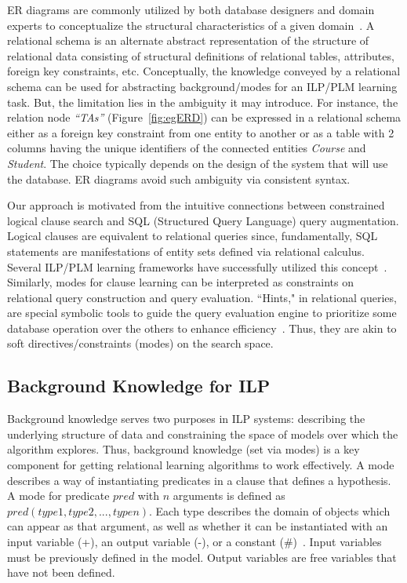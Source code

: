 \documentclass[sigconf]{acmart}
\begin{document}
ER diagrams are commonly utilized by both database designers and domain experts to conceptualize the structural characteristics of a given domain~\cite{garcia2009database}. A relational schema is an alternate abstract representation of the structure of relational data consisting of structural definitions of relational tables, attributes, foreign key constraints, etc. Conceptually, the knowledge conveyed by a relational schema can be used for abstracting background/modes for an ILP/PLM learning task. But, the limitation lies in the ambiguity it may introduce. For instance, the relation node \textit{``TAs''} (Figure~\ref{fig:egERD}) can be expressed in a relational schema either as a foreign key constraint from one entity to another or as a table with 2 columns having the unique identifiers of the connected entities \textit{Course} and \textit{Student}. The choice typically depends on the design of the system that will use the database. ER diagrams avoid such ambiguity via consistent syntax. 

Our approach is motivated from the intuitive connections between constrained logical clause search and SQL (Structured Query Language) query augmentation.
Logical clauses are equivalent to relational queries since, fundamentally, SQL statements are manifestations of entity sets defined via relational calculus. Several ILP/PLM learning frameworks have successfully utilized this concept~\cite{niuvldb11,malec2016inductive}. Similarly, modes for clause learning can be interpreted as constraints on relational query construction and query evaluation.  ``Hints," in relational queries, are special symbolic tools to guide the query evaluation engine to prioritize some database operation over the others to enhance efficiency~\cite{lohman2000relational,diab2009search,bruno2012flexible}. Thus, they are akin to soft directives/constraints (modes) on the search space.

\subsection{Background Knowledge for ILP}

Background knowledge serves two purposes in ILP systems: describing the underlying structure of data and constraining the space of models over which the algorithm  explores. Thus, background knowledge (set via modes) is a key component for getting relational learning algorithms to work effectively. A mode describes a way of instantiating predicates in a clause that defines a hypothesis. A mode for predicate $pred$ with $n$ arguments is defined as $pred(type1,type2,...,typen)$. Each type describes the domain of objects which can appear as that argument, as well as whether it can be instantiated with an input variable (+), an output variable (-), or a constant (\#)~\cite{aleph}. Input variables must be previously defined in the model. Output variables are free variables that have not been defined. 
\end{document}
